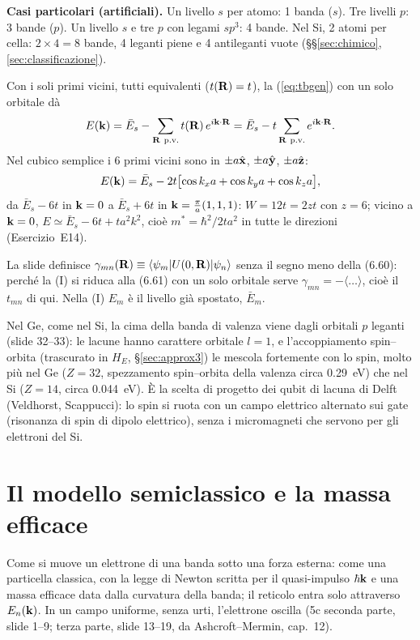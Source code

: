 \documentclass[11pt,a4paper]{article}
\begin{document}
\textbf{Casi particolari (artificiali).} Un livello $s$ per atomo: 1 banda ($s$). Tre livelli $p$: 3 bande ($p$). Un livello $s$ e tre $p$ con legami $sp^3$:
4 bande. Nel Si, 2 atomi per cella: $2\times4=8$ bande, 4 leganti piene e 4 antileganti vuote (§§\ref{sec:chimico}, \ref{sec:classificazione}).

Con i soli primi vicini, tutti equivalenti ($t(\mathbf R)=t$), la (\ref{eq:tbgen}) con un solo orbitale dà
\[
E(\vk)=\bar E_s-\sum_{\vR\ \text{p.v.}}t(\vR)\,e^{i\vk\cdot\vR}=\bar E_s-t\sum_{\vR\ \text{p.v.}}e^{i\vk\cdot\vR}.
\]
Nel cubico semplice i 6 primi vicini sono in $\pm a\hat{\mathbf x}$, $\pm a\hat{\mathbf y}$, $\pm a\hat{\mathbf z}$:
\[
E(\mathbf k)=\bar E_s-2t\bigl[\cos k_xa+\cos k_ya+\cos k_za\bigr],
\]
da $\bar E_s-6t$ in $\mathbf k=0$ a $\bar E_s+6t$ in $\mathbf k=\frac\pi a(1,1,1)$: $W=12t=2zt$ con $z=6$; vicino a $\mathbf k=0$, $E\simeq\bar E_s-6t+ta^2k^2$, cioè
$m^*=\hbar^2/2ta^2$ in tutte le direzioni (Esercizio~E14).
\begin{osservazione}
La slide definisce $\gamma_{mn}(\mathbf R)\equiv\langle\psi_m|U(0,\mathbf R)|\psi_n\rangle$ senza il segno meno della (6.60): perché la (I) si riduca alla (6.61) con
un solo orbitale serve $\gamma_{mn}=-\langle\dots\rangle$, cioè il $t_{mn}$ di qui. Nella (I) $E_m$ è il livello già spostato, $\bar E_m$.
\end{osservazione}

\begin{infobox}
Nel Ge, come nel Si, la cima della banda di valenza viene dagli orbitali $p$ leganti (slide 32--33): le lacune hanno carattere orbitale $l=1$, e
l'accoppiamento spin--orbita (trascurato in $H_E$, §\ref{sec:approx3}) le mescola fortemente con lo spin, molto più nel Ge ($Z=32$, spezzamento
spin--orbita della valenza circa \SI{0.29}{eV}) che nel Si ($Z=14$, circa \SI{0.044}{eV}). È la scelta di progetto dei qubit di lacuna di Delft
(Veldhorst, Scappucci): lo spin si ruota con un campo elettrico alternato sui gate (risonanza di spin di dipolo elettrico), senza i micromagneti che
servono per gli elettroni del Si.
\end{infobox}

\section{Il modello semiclassico e la massa efficace}\label{sec:semicl}
Come si muove un elettrone di una banda sotto una forza esterna: come una particella classica, con la legge di Newton scritta per il quasi-impulso
$\hbar\mathbf k$ e una massa efficace data dalla curvatura della banda; il reticolo entra solo attraverso $E_n(\mathbf k)$. In un campo uniforme, senza urti,
l'elettrone oscilla (5c seconda parte, slide 1--9; terza parte, slide 13--19, da Ashcroft--Mermin, cap.~12).
\end{document}
